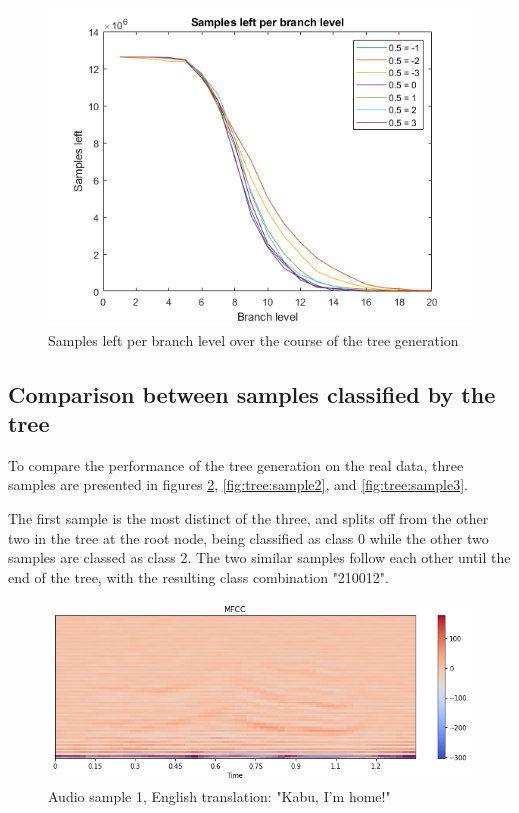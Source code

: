 \begin{figure}  %
  \centering
  \includegraphics[width=.7\textwidth]{figures/treesampleloss.png}
  \caption{Samples left per branch level over the course of the tree generation}
  \label{fig:tree:sampleloss}
\end{figure}

\subsection{Comparison between samples classified by the tree}

To compare the performance of the tree generation on the real data, three samples are presented in figures \cref{fig:tree:sample1}, \cref{fig:tree:sample2}, and \cref{fig:tree:sample3}.

The first sample is the most distinct of the three, and splits off from the other two in the tree at the root node, being classified as class 0 while the other two samples are classed as class 2.
The two similar samples follow each other until the end of the tree, with the resulting class combination "210012".

\begin{figure}  %
  \centering
  \includegraphics[width=.7\textwidth]{figures/sample1.png}
  \caption{Audio sample 1, English translation: "Kabu, I'm home!"}
  \label{fig:tree:sample1}
\end{figure}

